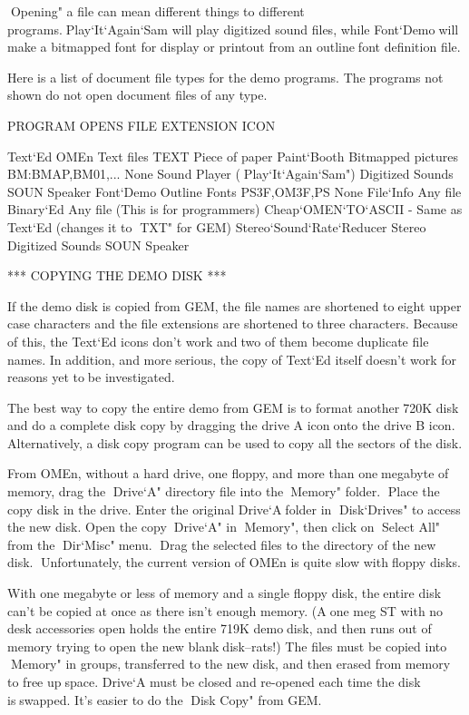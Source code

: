 Opening" a file can mean different things to different programs.Play`It`Again`Sam will play digitized sound files, while Font`Demowill make a bitmapped font for display or printout from an outlinefont definition file.

Here is a list of document file types for the demo programs. Theprograms not shown do not open document files of any type.

   PROGRAM      OPENS              FILE EXTENSION   ICON

   Text`Ed      OMEn Text files    TEXT             Piece of paper
   Paint`Booth  Bitmapped pictures BM:BMAP,BM01,... None
   Sound Player (Play`It`Again`Sam")
                Digitized Sounds   SOUN             Speaker
   Font`Demo    Outline Fonts      PS3F,OM3F,PS     None
   File`Info    Any file
   Binary`Ed    Any file (This is for programmers)
   Cheap`OMEN`TO`ASCII
   - Same as Text`Ed (changes it to TXT" for GEM)
   Stereo`Sound`Rate`Reducer
         Stereo Digitized Sounds   SOUN             Speaker


*** COPYING THE DEMO DISK ***

If the demo disk is copied from GEM, the file names are shortened toeight upper case characters and the file extensions are shortened tothree characters. Because of this, the Text`Ed icons don't work andtwo of them become duplicate file names. In addition, and moreserious, the copy of Text`Ed itself doesn't work for reasons yet tobe investigated.

The best way to copy the entire demo from GEM is to format another720K disk and do a complete disk copy by dragging the drive A icononto the drive B icon. Alternatively, a disk copy program can be usedto copy all the sectors of the disk.

From OMEn, without a hard drive, one floppy, and more than onemegabyte of memory, drag the Drive`A" directory file into theMemory" folder.
Place the copy disk in the drive. Enter the original Drive`Afolder in Disk`Drives" to access the new disk. Open the copyDrive`A" in Memory", then click on Select All" from the Dir`Misc"menu.
Drag the selected files to the directory of the new disk.
Unfortunately, the current version of OMEn is quite slow withfloppy disks.

With one megabyte or less of memory and a single floppy disk, theentire disk can't be copied at once as there isn't enough memory. (Aone meg ST with no desk accessories open holds the entire 719K demodisk, and then runs out of memory trying to open the new blankdisk--rats!) The files must be copied into Memory" in groups,transferred to the new disk, and then erased from memory to free upspace. Drive`A must be closed and re-opened each time the disk isswapped. It's easier to do the Disk Copy" from GEM.

